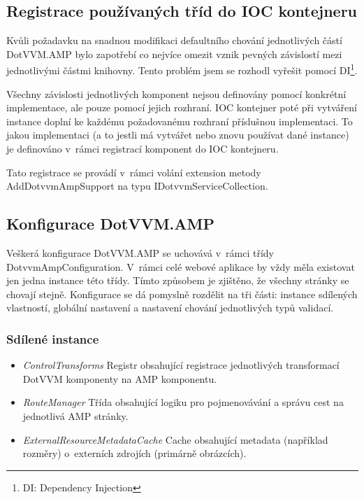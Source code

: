 \subsection*{Registrace používaných tříd do IOC kontejneru}

Kvůli požadavku na snadnou modifikaci defaultního chování jednotlivých částí DotVVM.AMP bylo zapotřebí co nejvíce omezit vznik pevných závislostí mezi jednotlivými částmi knihovny. Tento problém jsem se rozhodl vyřešit pomocí DI\footnote{\label{DI}DI: Dependency Injection}.

Všechny závislosti jednotlivých komponent nejsou definovány pomocí konkrétní implementace, ale pouze pomocí jejich rozhraní. IOC kontejner poté při vytváření instance doplní ke každému požadovanému rozhraní příslušnou implementaci. To jakou implementaci (a to jestli má vytvářet nebo znovu používat dané instance) je definováno v~rámci registrací komponent do IOC kontejneru.

Tato registrace se provádí v~rámci volání extension metody AddDotvvmAmpSupport na typu IDotvvmServiceCollection.

\subsection*{Konfigurace DotVVM.AMP}
Veškerá konfigurace DotVVM.AMP se uchovává v~rámci třídy DotvvmAmpConfiguration. V~rámci celé webové aplikace by vždy měla existovat jen jedna instance této třídy. Tímto způsobem je zjištěno, že všechny stránky se chovají stejně. Konfigurace se dá pomyslně rozdělit na tři části: instance sdílených vlastností, globální nastavení a nastavení chování jednotlivých typů validací.

\subsubsection{Sdílené instance}
\begin{itemize}
    \item \textit{ControlTransforms} \newline
Registr obsahující registrace jednotlivých transformací DotVVM komponenty na AMP komponentu.
    \item \textit{RouteManager}\newline
Třída obsahující logiku pro pojmenovávání a správu cest na jednotlivá AMP stránky.
    \item \textit{ExternalResourceMetadataCache}\newline
Cache obsahující metadata (například rozměry) o~externích zdrojích (primárně obrázcích).
\end{itemize}

